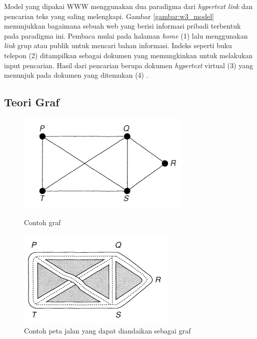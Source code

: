\documentclass[
	a4paper, %
	12pt, %
	unnumberedsections, %
	twoside, %
]{LTJournalArticle}
\begin{document}
Model yang dipakai WWW menggunakan dua paradigma dari \textit{hypertext link} dan pencarian teks yang saling melengkapi. Gambar \ref{gambar:w3_model} menunjukkan bagaimana sebuah web yang berisi informasi pribadi terbentuk pada paradigma ini. Pembaca mulai pada halaman \textit{home} (1) lalu menggunakan \textit{link} grup atau publik untuk mencari bahan informasi. Indeks seperti buku telepon (2) ditampilkan sebagai dokumen yang memungkinkan untuk melakukan input pencarian. Hasil dari pencarian berupa dokumen \textit{hypertext} virtual (3) yang menunjuk pada dokumen yang ditemukan (4) \citep{bernersLee1992}.

\subsection{Teori Graf}

\begin{figure}[!htb]
\begin{minipage}{0.48\textwidth}
	\centering
	\includegraphics[width=.7\linewidth]{gambar/graph_example}
	\caption{Contoh graf \citep{wilson1996}}
	\label{gambar:graph_example}
\end{minipage}\hfill
\begin{minipage}{0.48\textwidth}
	\centering
	\includegraphics[width=.7\linewidth]{gambar/graph_example_2}
	\caption{Contoh peta jalan yang dapat diandaikan sebagai graf \citep{wilson1996}}
	\label{gambar:graph_example_2}
\end{minipage}
\end{figure}
\end{document}
